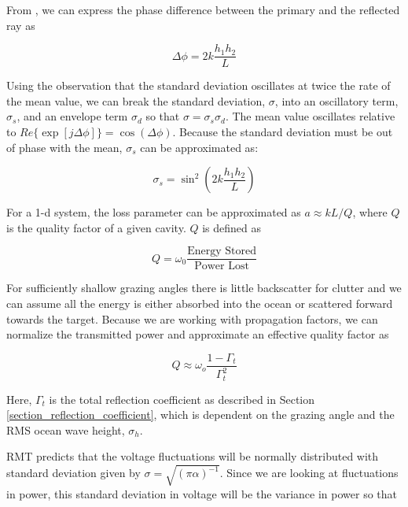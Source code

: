 From \cite{frazier_green}, we can express the phase difference between the primary and the reflected ray as

\begin{equation}
\Delta\phi = 2k\frac{h_1h_2}{L}
\end{equation}
\renewcommand{\baselinestretch}{2} \small\normalsize

Using the observation that the standard deviation oscillates at twice the rate of the mean value, we can break the standard deviation, $\sigma$, into an oscillatory term, $\sigma_s$, and an envelope term $\sigma_d$ so that $\sigma = \sigma_s \sigma_d$. The mean value oscillates relative to $Re\{\exp\left[j\Delta\phi\right]\} = \cos\left(\Delta\phi\right)$. Because the standard deviation must be out of phase with the mean, $\sigma_s$ can be approximated as:

\begin{equation}
\sigma_s = \sin^2\left(2k\frac{h_1h_2}{L}\right)
\end{equation}
\renewcommand{\baselinestretch}{2} \small\normalsize

For a 1-d system, the loss parameter can be approximated as $a \approx kL/Q$, where $Q$ is the quality factor of a given cavity. $Q$ is defined as \cite{pozar_microwave}

\begin{equation}
Q = \omega_0\frac{\text{Energy Stored}}{\text{Power Lost}}
\end{equation}
\renewcommand{\baselinestretch}{2} \small\normalsize

For sufficiently shallow grazing angles there is little backscatter for clutter and we can assume all the energy is either absorbed into the ocean or scattered forward towards the target. Because we are working with propagation factors, we can normalize the transmitted power and approximate an effective quality factor as

\begin{equation}
Q \approx \omega_o\frac{1-\Gamma_t}{\Gamma_t^2}
\end{equation}
\renewcommand{\baselinestretch}{2} \small\normalsize

Here, $\Gamma_t$ is the total reflection coefficient as described in Section \ref{section_reflection_coefficient}, which is dependent on the grazing angle and the RMS ocean wave height, $\sigma_h$.

RMT predicts that the voltage fluctuations will be normally distributed with standard deviation given by $\sigma = \sqrt{(\pi \alpha)^{-1}}$. Since we are looking at fluctuations in power, this standard deviation in voltage will be the variance in power so that

